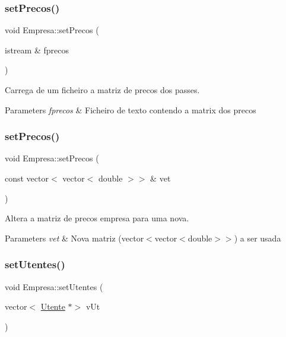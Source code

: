 \subsubsection{\texorpdfstring{set\+Precos()}{setPrecos()}\hspace{0.1cm}{\footnotesize\ttfamily [1/2]}}
{\footnotesize\ttfamily void Empresa\+::set\+Precos (\begin{DoxyParamCaption}\item[{istream \&}]{fprecos }\end{DoxyParamCaption})}



Carrega de um ficheiro a matriz de precos dos passes. 


\begin{DoxyParams}{Parameters}
{\em fprecos} & Ficheiro de texto contendo a matrix dos precos \\
\hline
\end{DoxyParams}
\mbox{\label{class_empresa_a5045b1da6fe55685e04a89d4fd61aa1a}} 
\subsubsection{\texorpdfstring{set\+Precos()}{setPrecos()}\hspace{0.1cm}{\footnotesize\ttfamily [2/2]}}
{\footnotesize\ttfamily void Empresa\+::set\+Precos (\begin{DoxyParamCaption}\item[{const vector$<$ vector$<$ double $>$$>$ \&}]{vet }\end{DoxyParamCaption})}



Altera a matriz de precos empresa para uma nova. 


\begin{DoxyParams}{Parameters}
{\em vet} & Nova matriz (vector$<$vector$<$double$>$$>$) a ser usada \\
\hline
\end{DoxyParams}
\mbox{\label{class_empresa_a0733c7676b94e4e273b3e9b5f7d1c5ad}} 
\subsubsection{\texorpdfstring{set\+Utentes()}{setUtentes()}}
{\footnotesize\ttfamily void Empresa\+::set\+Utentes (\begin{DoxyParamCaption}\item[{vector$<$ \mbox{\hyperlink{class_utente}{Utente}} $\ast$$>$}]{v\+Ut }\end{DoxyParamCaption})}



